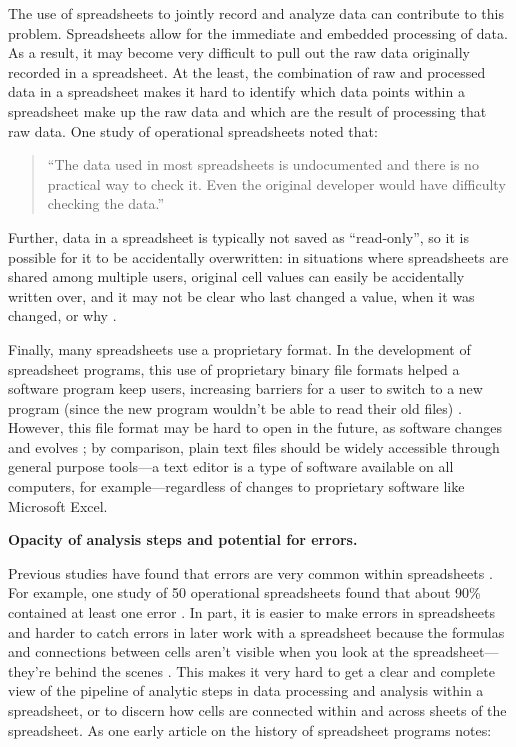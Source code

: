 \documentclass[]{tufte-book}
\begin{document}
The use of spreadsheets to jointly record and analyze data can contribute to
this problem. Spreadsheets allow for the immediate and embedded processing of
data. As a result, it may become very difficult to pull out the raw data
originally recorded in a spreadsheet. At the least, the combination of raw and
processed data in a spreadsheet makes it hard to identify which data points
within a spreadsheet make up the raw data and which are the result of processing
that raw data. One study of operational spreadsheets noted that:

\begin{quote}
``The data used in most spreadsheets is undocumented and there is no practical
way to check it. Even the original developer would have difficulty checking the
data.'' \citep{powell2009errors}
\end{quote}

Further, data in a spreadsheet is typically not saved as ``read-only'', so it is
possible for it to be accidentally overwritten: in situations where spreadsheets
are shared among multiple users, original cell values can easily be accidentally
written over, and it may not be clear who last changed a value, when it was
changed, or why \citep{altarawneh2017pilot}.

Finally, many spreadsheets use a proprietary format. In the development of
spreadsheet programs, this use of proprietary binary file formats helped a
software program keep users, increasing barriers for a user to switch to a new
program (since the new program wouldn't be able to read their old files)
\citep{campbell2007number}. However, this file format may be hard to open in the
future, as software changes and evolves \citep{michener2015ten}; by comparison, plain
text files should be widely accessible through general purpose tools---a text
editor is a type of software available on all computers, for
example---regardless of changes to proprietary software like Microsoft Excel.

\textbf{Opacity of analysis steps and potential for errors.}

Previous studies have found that errors are very common within spreadsheets
\citep{hermans2016spreadsheets}. For example, one study of 50 operational
spreadsheets found that about 90\% contained at least one error
\citep{powell2009errors}. In part, it is easier to make errors in spreadsheets and
harder to catch errors in later work with a spreadsheet because the formulas and
connections between cells aren't visible when you look at the
spreadsheet---they're behind the scenes \citep{birch2018future}. This makes it very
hard to get a clear and complete view of the pipeline of analytic steps in data
processing and analysis within a spreadsheet, or to discern how cells
are connected within and across sheets of the spreadsheet. As one early article on
the history of spreadsheet programs notes:
\end{document}
